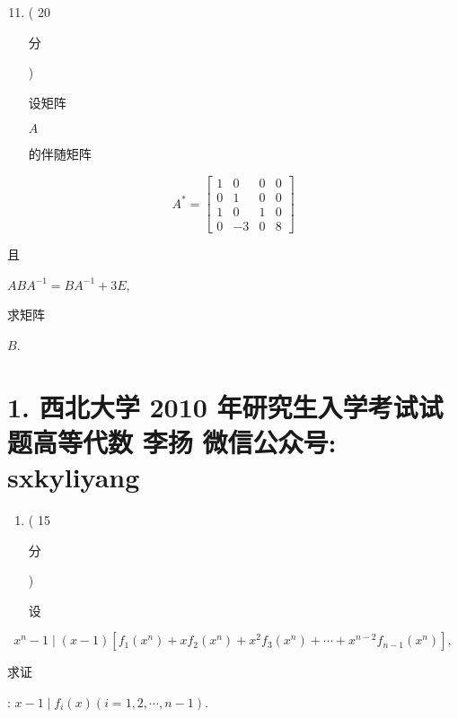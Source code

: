 \documentclass[10pt]{article}
\begin{document}
\begin{enumerate}
  \setcounter{enumi}{10}
  \item ( 20 \begin{CJK}{UTF8}{mj}分\end{CJK}) \begin{CJK}{UTF8}{mj}设矩阵\end{CJK} $A$ \begin{CJK}{UTF8}{mj}的伴随矩阵\end{CJK}
\end{enumerate}
$$
A^{*}=\left[\begin{array}{cccc}
1 & 0 & 0 & 0 \\
0 & 1 & 0 & 0 \\
1 & 0 & 1 & 0 \\
0 & -3 & 0 & 8
\end{array}\right]
$$
\begin{CJK}{UTF8}{mj}且\end{CJK} $A B A^{-1}=B A^{-1}+3 E$, \begin{CJK}{UTF8}{mj}求矩阵\end{CJK} $B$.

\section{1. 西北大学 2010 年研究生入学考试试题高等代数 
 李扬 
 微信公众号: sxkyliyang}
\begin{enumerate}
  \item ( 15 \begin{CJK}{UTF8}{mj}分\end{CJK}) \begin{CJK}{UTF8}{mj}设\end{CJK}
\end{enumerate}
$$
x^{n}-1 \mid(x-1)\left[f_{1}\left(x^{n}\right)+x f_{2}\left(x^{n}\right)+x^{2} f_{3}\left(x^{n}\right)+\cdots+x^{n-2} f_{n-1}\left(x^{n}\right)\right],
$$
\begin{CJK}{UTF8}{mj}求证\end{CJK}: $x-1 \mid f_{i}(x)(i=1,2, \cdots, n-1)$.
\end{document}
